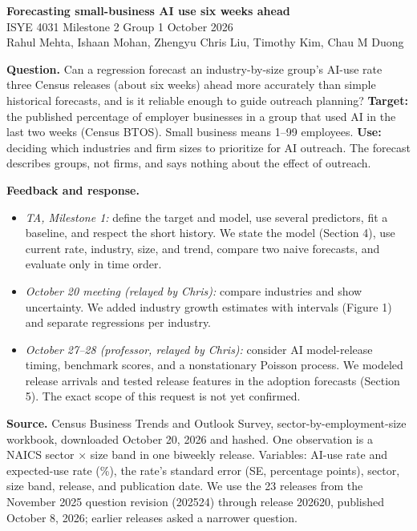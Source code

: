 \documentclass[10pt]{article}
\renewcommand{\section}[1]{\needspace{5\baselineskip}\vspace{5pt}{\large\bfseries #1\par}\vspace{1pt}}
\begin{document}
{\Large\bfseries Forecasting small-business AI use six weeks ahead}\\[2pt]
ISYE 4031 Milestone 2 \textbullet{} Group 1 \textbullet{} October 2026\\
Rahul Mehta, Ishaan Mohan, Zhengyu Chris Liu, Timothy Kim, Chau M Duong

\section{1. Question and response to feedback}
\textbf{Question.} Can a regression forecast an industry-by-size group's AI-use rate three Census releases (about six weeks) ahead more accurately than simple historical forecasts, and is it reliable enough to guide outreach planning?
\textbf{Target:} the published percentage of employer businesses in a group that used AI in the last two weeks (Census BTOS). Small business means 1--99 employees.
\textbf{Use:} deciding which industries and firm sizes to prioritize for AI outreach. The forecast describes groups, not firms, and says nothing about the effect of outreach.

\textbf{Feedback and response.}
\begin{itemize}
\item \emph{TA, Milestone 1:} define the target and model, use several predictors, fit a baseline, and respect the short history. We state the model (Section 4), use current rate, industry, size, and trend, compare two naive forecasts, and evaluate only in time order.
\item \emph{October 20 meeting (relayed by Chris):} compare industries and show uncertainty. We added industry growth estimates with intervals (Figure 1) and separate regressions per industry.
\item \emph{October 27--28 (professor, relayed by Chris):} consider AI model-release timing, benchmark scores, and a nonstationary Poisson process. We modeled release arrivals and tested release features in the adoption forecasts (Section 5). The exact scope of this request is not yet confirmed.
\end{itemize}

\section{2. Data and preparation}
\textbf{Source.} Census Business Trends and Outlook Survey, sector-by-employment-size workbook, downloaded October 20, 2026 and hashed. One observation is a NAICS sector $\times$ size band in one biweekly release. Variables: AI-use rate and expected-use rate (\%), the rate's standard error (SE, percentage points), sector, size band, release, and publication date. We use the 23 releases from the November 2025 question revision (202524) through release 202620, published October 8, 2026; earlier releases asked a narrower question.
\end{document}
